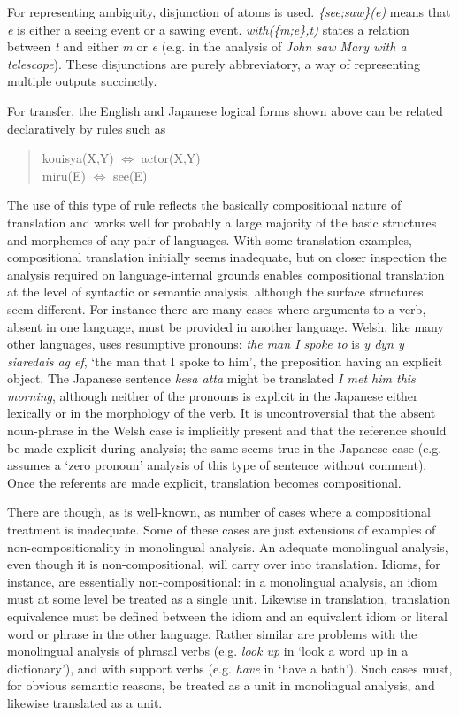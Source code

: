 For representing ambiguity, disjunction of atoms is used. 
{\it \{see;saw\}{\rm (}e{\rm )}\/}
means that
{\it e\/}
is either a seeing event or a sawing event.
{\it with{\rm (}\{m;e\},t{\rm )}\/}
states a relation between
{\it t\/}
and either
{\it m\/}
or
{\it e\/}
(e.g. in the analysis of
{\it John saw Mary with a telescope}).
These disjunctions are purely abbreviatory, a way of representing
multiple outputs succinctly.

For transfer,
the English and Japanese logical forms shown above can be related
declaratively by rules such as
\begin{quote}
  \smallskip
  \small
  kouisya(X,Y) $\Leftrightarrow$ actor(X,Y)\\
  miru(E) $\Leftrightarrow$ see(E)
\end{quote}
The use of this type of rule reflects the basically compositional nature
of translation and works well for probably a large majority of the basic
structures and morphemes of any pair of languages.
With some translation examples, compositional translation initially
seems inadequate, but on closer inspection the analysis required on
language-internal grounds enables compositional translation at the level
of syntactic or semantic analysis, although the surface structures seem
different.
For instance there are many cases where arguments to a verb, absent in
one language, must be provided in another language.
Welsh, like many other languages, uses resumptive pronouns:
{\it the man I spoke to\/}
is
{\it y dyn y siaredais ag ef},
`the man that I spoke to him',
the preposition having an explicit object.
The Japanese sentence
{\it kesa atta\/}
might be translated
{\it I met him this morning},
although neither of the pronouns is explicit in the Japanese either
lexically or in the morphology of the verb.
It is uncontroversial that the absent noun-phrase in the Welsh case is
implicitly present and that the reference should be made explicit during
analysis; the same seems true in the Japanese case
(e.g. \cite{gunji:87:a} assumes a `zero pronoun' analysis
of this type of sentence without comment).
Once the referents are made explicit, translation becomes compositional.

There are though, as is well-known, as number of cases where a
compositional treatment is inadequate.
Some of these cases are just extensions of examples of
non-compositionality in monolingual analysis.
An adequate monolingual analysis, even though it is non-compositional,
will carry over into translation. Idioms, for instance, are essentially
non-compositional: in a monolingual analysis, an idiom must at some
level be treated as a single unit.
Likewise in translation, translation equivalence must be defined between
the idiom and an equivalent idiom or literal word or phrase in the other
language.
Rather similar are problems with the monolingual analysis of phrasal verbs
(e.g.
{\it look up\/}
in `look a word up in a dictionary'), and with support verbs (e.g.
{\it have\/}
in `have a bath').
Such cases must, for obvious semantic reasons, be treated as a unit in
monolingual analysis, and likewise translated as a unit.

